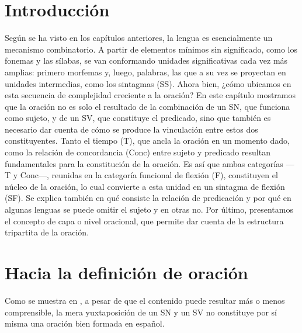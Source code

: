 
\section{Introducción}

Según se ha visto en los capítulos anteriores, la lengua es esencialmente un
mecanismo combinatorio. A partir de elementos mínimos sin significado, como los
fonemas y las sílabas, se van conformando unidades significativas cada vez más
amplias: primero morfemas y, luego, palabras, las que a su vez se proyectan en
unidades intermedias, como los sintagmas (SS). Ahora bien, ¿cómo ubicamos en esta
secuencia de complejidad creciente a la oración? En este capítulo mostramos que
la oración no es solo el resultado de la combinación de un SN, que funciona como
sujeto, y de un SV, que constituye el predicado, sino que también es necesario
dar cuenta de cómo se produce la vinculación entre estos dos constituyentes.
Tanto el tiempo (T), que ancla la oración en un momento dado, como la relación
de concordancia (Conc) entre sujeto y predicado resultan fundamentales para la
constitución de la oración. Es así que ambas categorías ---T y Conc---, reunidas
en la categoría funcional de flexión (F), constituyen el núcleo de la oración,
lo cual convierte a esta unidad en un sintagma de flexión (SF). Se explica
también en qué consiste la relación de predicación y por qué en algunas lenguas
se puede omitir el sujeto y en otras no. Por último, presentamos el concepto de
capa o nivel oracional, que permite dar cuenta de la estructura tripartita de
la oración.

\section{Hacia la definición de oración}\label{sec:06-definicion}

Como se muestra en , a pesar de que el contenido puede
resultar más o menos comprensible, la mera yuxtaposición de un SN y un SV no
constituye por sí misma una oración bien formada en español.

\begin{exe}
\end{exe}

